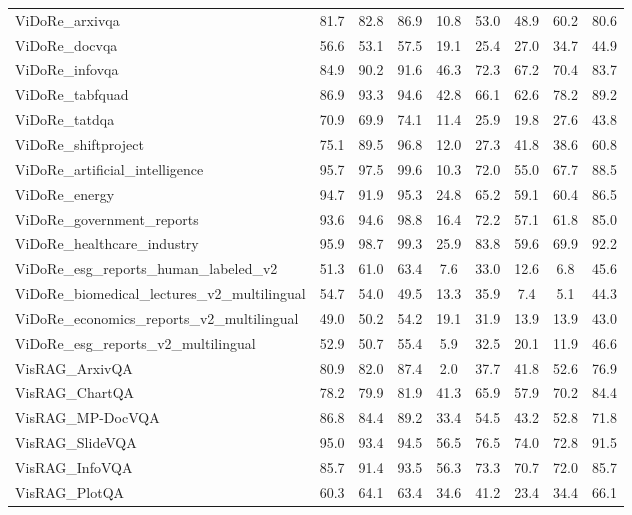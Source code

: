 \begin{table}[!ht]
\begin{adjustbox}{width=\textwidth}
\begin{tabular}{l|cccccccc}
        ViDoRe\_arxivqa & 81.7 & 82.8 & 86.9 & 10.8 & 53.0 & 48.9 & 60.2 & 80.6 \\ 
        ViDoRe\_docvqa & 56.6 & 53.1 & 57.5 & 19.1 & 25.4 & 27.0 & 34.7 & 44.9 \\ 
        ViDoRe\_infovqa & 84.9 & 90.2 & 91.6 & 46.3 & 72.3 & 67.2 & 70.4 & 83.7 \\ 
        ViDoRe\_tabfquad & 86.9 & 93.3 & 94.6 & 42.8 & 66.1 & 62.6 & 78.2 & 89.2 \\ 
        ViDoRe\_tatdqa & 70.9 & 69.9 & 74.1 & 11.4 & 25.9 & 19.8 & 27.6 & 43.8 \\ 
        ViDoRe\_shiftproject & 75.1 & 89.5 & 96.8 & 12.0 & 27.3 & 41.8 & 38.6 & 60.8 \\ 
        ViDoRe\_artificial\_intelligence & 95.7 & 97.5 & 99.6 & 10.3 & 72.0 & 55.0 & 67.7 & 88.5 \\ 
        ViDoRe\_energy & 94.7 & 91.9 & 95.3 & 24.8 & 65.2 & 59.1 & 60.4 & 86.5 \\ 
        ViDoRe\_government\_reports & 93.6 & 94.6 & 98.8 & 16.4 & 72.2 & 57.1 & 61.8 & 85.0 \\ 
        ViDoRe\_healthcare\_industry & 95.9 & 98.7 & 99.3 & 25.9 & 83.8 & 59.6 & 69.9 & 92.2 \\ 
        ViDoRe\_esg\_reports\_human\_labeled\_v2 & 51.3 & 61.0 & 63.4 & 7.6 & 33.0 & 12.6 & 6.8 & 45.6 \\ 
        ViDoRe\_biomedical\_lectures\_v2\_multilingual & 54.7 & 54.0 & 49.5 & 13.3 & 35.9 & 7.4 & 5.1 & 44.3 \\ 
        ViDoRe\_economics\_reports\_v2\_multilingual & 49.0 & 50.2 & 54.2 & 19.1 & 31.9 & 13.9 & 13.9 & 43.0 \\ 
        ViDoRe\_esg\_reports\_v2\_multilingual & 52.9 & 50.7 & 55.4 & 5.9 & 32.5 & 20.1 & 11.9 & 46.6 \\ 
        VisRAG\_ArxivQA & 80.9 & 82.0 & 87.4 & 2.0 & 37.7 & 41.8 & 52.6 & 76.9 \\ 
        VisRAG\_ChartQA & 78.2 & 79.9 & 81.9 & 41.3 & 65.9 & 57.9 & 70.2 & 84.4 \\ 
        VisRAG\_MP-DocVQA & 86.8 & 84.4 & 89.2 & 33.4 & 54.5 & 43.2 & 52.8 & 71.8 \\ 
        VisRAG\_SlideVQA & 95.0 & 93.4 & 94.5 & 56.5 & 76.5 & 74.0 & 72.8 & 91.5 \\ 
        VisRAG\_InfoVQA & 85.7 & 91.4 & 93.5 & 56.3 & 73.3 & 70.7 & 72.0 & 85.7 \\ 
        VisRAG\_PlotQA & 60.3 & 64.1 & 63.4 & 34.6 & 41.2 & 23.4 & 34.4 & 66.1 \\ 

\end{tabular}
\end{adjustbox}
\end{table}
